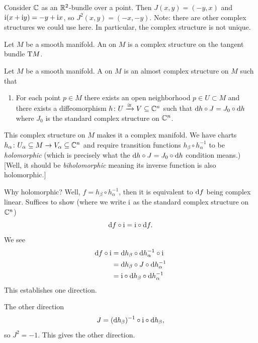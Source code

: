 \begin{example}
Consider $\mathbb{C}$ as an $\mathbb{R}^{2}$-bundle over a point.
Then $J(x,y)=(-y,x)$ and $\mathrm{i}(x+\mathrm{i} y)=-y+\mathrm{i} x$, so $J^{2}(x,y)=(-x,-y)$.
Note: there are other complex structures we could use here. In
particular, the complex structure is not unique.
\end{example}

\begin{definition}
Let $M$ be a smooth manifold. An  on
$M$ is a complex structure on the tangent bundle $\mathrm{T} M$.
\end{definition}

\begin{definition}
Let $M$ be a smooth manifold.
A  on $M$ is an almost complex structure on
$M$ such that
\begin{enumerate}
\item For each point $p\in M$ there exists an open neighborhood $p\in U\subset M$
  and there exists a diffeomorphism $h\colon U\xrightarrow{\cong} V\subseteq\mathbb{C}^{n}$
  such that $\mathrm{d} h\circ J = J_{0}\circ\mathrm{d} h$ where $J_{0}$ is the
  standard complex structure on $\mathbb{C}^{n}$.
\end{enumerate}
\end{definition}

\begin{remark}
This complex structure on $M$ makes it a complex manifold. We have
charts $h_{\alpha}\colon U_{\alpha}\subseteq M\to V_{\alpha}\subseteq\mathbb{C}^{n}$
and require transition functions $h_{\beta}\circ h_{\alpha}^{-1}$ to
be \emph{holomorphic} (which is precisely what the $\mathrm{d} h\circ J=J_{0}\circ\mathrm{d} h$
condition means.)
[Well, it should be \emph{biholomorphic} meaning its inverse function
  is also holomorphic.]

Why holomorphic? Well, $f=h_{\beta}\circ h_{\alpha}^{-1}$, then it is
equivalent to $\mathrm{d} f$ being complex linear. Suffices to show (where we
write $\mathrm{i}$ as the standard complex structure on $\mathbb{C}^{n}$)
\begin{equation}
\mathrm{d} f\circ\mathrm{i}=\mathrm{i}\circ\mathrm{d} f.
\end{equation}
We see
\begin{subequations}
  \begin{align}
\mathrm{d} f\circ\mathrm{i} &= \mathrm{d} h_{\beta}\circ\mathrm{d} h_{\alpha}^{-1}\circ\mathrm{i}\\
&= \mathrm{d} h_{\beta}\circ J\circ\mathrm{d} h_{\alpha}^{-1}\\
&= \mathrm{i}\circ\mathrm{d} h_{\beta}\circ\mathrm{d} h_{\alpha}^{-1}
  \end{align}
\end{subequations}
This establishes one direction.

The other direction
\begin{equation}
J=(\mathrm{d} h_{\beta})^{-1}\circ\mathrm{i}\circ\mathrm{d} h_{\beta},
\end{equation}
so $J^{2}=-1$. This gives the other direction.
\end{remark}

